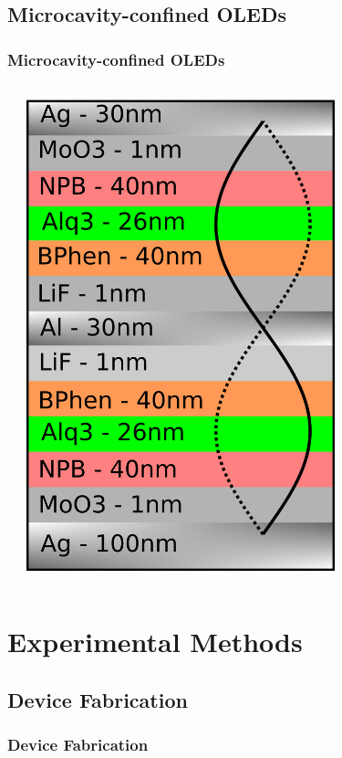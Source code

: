 \documentclass{beamer}
\begin{document}
    \subsection{Microcavity-confined OLEDs}
        \begin{frame}
            \frametitle{Microcavity-confined OLEDs}
            \begin{columns}
				\begin{column}{0.5\textwidth}
				\end{column}
				\begin{column}{0.5\textwidth}
					\centering
					\includegraphics[width=0.7\textwidth]{images/schematic.png}
				\end{column}
            \end{columns}

        \end{frame}
        
\section{Experimental Methods}
    \frame{\tableofcontents[currentsection]}
    \subsection{Device Fabrication}
		\begin{frame}
			\frametitle{Device Fabrication}
		\end{frame}
    
\end{document}
